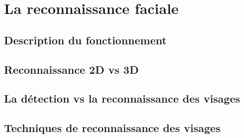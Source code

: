\section{La reconnaissance faciale}

\subsection{Description du fonctionnement}
\subsection{Reconnaissance 2D vs 3D}
\subsection{La détection vs la reconnaissance des visages}
\subsection{Techniques de reconnaissance des visages}
